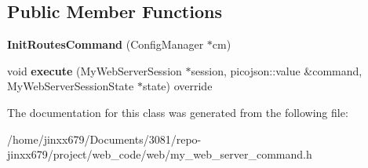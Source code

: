 \subsection*{Public Member Functions}
\begin{DoxyCompactItemize}
\item 
\mbox{\label{classInitRoutesCommand_a07712c3420ebcaa3eb2b9570d0374a15}} 
{\bfseries Init\+Routes\+Command} (Config\+Manager $\ast$cm)
\item 
\mbox{\label{classInitRoutesCommand_a7dceefcecf4dc5ef21a44764ea3c07de}} 
void {\bfseries execute} (My\+Web\+Server\+Session $\ast$session, picojson\+::value \&command, My\+Web\+Server\+Session\+State $\ast$state) override
\end{DoxyCompactItemize}


The documentation for this class was generated from the following file\+:\begin{DoxyCompactItemize}
\item 
/home/jinxx679/\+Documents/3081/repo-\/jinxx679/project/web\+\_\+code/web/my\+\_\+web\+\_\+server\+\_\+command.\+h\end{DoxyCompactItemize}
